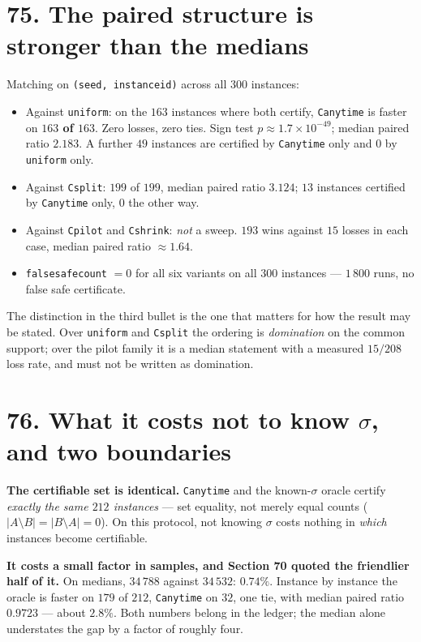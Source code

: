 \documentclass[9pt,twocolumn]{article}
\renewcommand{\_}{\CIGunderscore\allowbreak}
\begin{document}
\section*{75. The paired structure is stronger than the medians}
Matching on \texttt{(seed, instance\_id)} across all $300$ instances:

\begin{itemize}
\item Against \texttt{uniform}: on the $163$ instances where both certify, \texttt{C\_anytime} is faster on \textbf{$163$ of $163$}. Zero losses, zero ties. Sign test $p \approx 1.7\times10^{-49}$; median paired ratio $2.183$. A further $49$ instances are certified by \texttt{C\_anytime} only and $0$ by \texttt{uniform} only.
\item Against \texttt{C\_split}: $199$ of $199$, median paired ratio $3.124$; $13$ instances certified by \texttt{C\_anytime} only, $0$ the other way.
\item Against \texttt{C\_pilot} and \texttt{C\_shrink}: \emph{not} a sweep. $193$ wins against $15$ losses in each case, median paired ratio $\approx 1.64$.
\item \texttt{false\_safe\_count} $=0$ for all six variants on all $300$ instances --- $1\,800$ runs, no false safe certificate.
\end{itemize}

The distinction in the third bullet is the one that matters for how the result may be stated. Over \texttt{uniform} and \texttt{C\_split} the ordering is \emph{domination} on the common support; over the pilot family it is a median statement with a measured $15/208$ loss rate, and must not be written as domination.

\section*{76. What it costs not to know $\sigma$, and two boundaries}
\textbf{The certifiable set is identical.} \texttt{C\_anytime} and the known-$\sigma$ oracle certify \emph{exactly the same $212$ instances} --- set equality, not merely equal counts ($|A \setminus B| = |B \setminus A| = 0$). On this protocol, not knowing $\sigma$ costs nothing in \emph{which} instances become certifiable.

\textbf{It costs a small factor in samples, and Section 70 quoted the friendlier half of it.} On medians, $34\,788$ against $34\,532$: $0.74\%$. Instance by instance the oracle is faster on $179$ of $212$, \texttt{C\_anytime} on $32$, one tie, with median paired ratio $0.9723$ --- about $2.8\%$. Both numbers belong in the ledger; the median alone understates the gap by a factor of roughly four.
\end{document}
